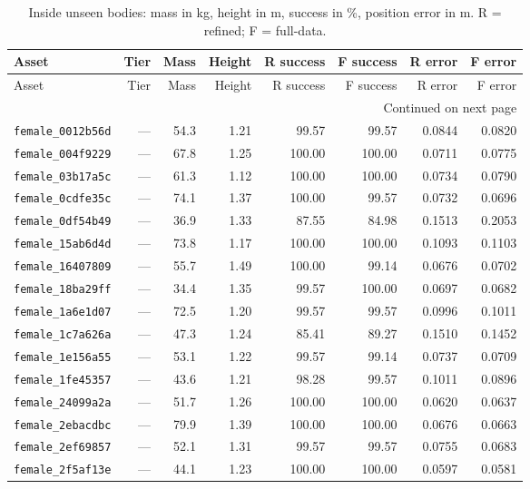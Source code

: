 \documentclass[11pt]{article}
\begin{document}
\begin{longtable}{lrrrrrrr}
\caption{Inside unseen bodies: mass in kg, height in m, success in \%,
position error in m. R = refined; F = full-data.}\label{tab:all_inside}\\
\toprule
Asset & Tier & Mass & Height & R success & F success & R error & F error \\
\midrule\endfirsthead
\toprule
Asset & Tier & Mass & Height & R success & F success & R error & F error \\
\midrule\endhead
\midrule\multicolumn{8}{r}{Continued on next page}\\\endfoot
\bottomrule\endlastfoot

\texttt{female\_0012b56d} & --- & 54.3 & 1.21 & 99.57 & 99.57 & 0.0844 & 0.0820 \\
\texttt{female\_004f9229} & --- & 67.8 & 1.25 & 100.00 & 100.00 & 0.0711 & 0.0775 \\
\texttt{female\_03b17a5c} & --- & 61.3 & 1.12 & 100.00 & 100.00 & 0.0734 & 0.0790 \\
\texttt{female\_0cdfe35c} & --- & 74.1 & 1.37 & 100.00 & 99.57 & 0.0732 & 0.0696 \\
\texttt{female\_0df54b49} & --- & 36.9 & 1.33 & 87.55 & 84.98 & 0.1513 & 0.2053 \\
\texttt{female\_15ab6d4d} & --- & 73.8 & 1.17 & 100.00 & 100.00 & 0.1093 & 0.1103 \\
\texttt{female\_16407809} & --- & 55.7 & 1.49 & 100.00 & 99.14 & 0.0676 & 0.0702 \\
\texttt{female\_18ba29ff} & --- & 34.4 & 1.35 & 99.57 & 100.00 & 0.0697 & 0.0682 \\
\texttt{female\_1a6e1d07} & --- & 72.5 & 1.20 & 99.57 & 99.57 & 0.0996 & 0.1011 \\
\texttt{female\_1c7a626a} & --- & 47.3 & 1.24 & 85.41 & 89.27 & 0.1510 & 0.1452 \\
\texttt{female\_1e156a55} & --- & 53.1 & 1.22 & 99.57 & 99.14 & 0.0737 & 0.0709 \\
\texttt{female\_1fe45357} & --- & 43.6 & 1.21 & 98.28 & 99.57 & 0.1011 & 0.0896 \\
\texttt{female\_24099a2a} & --- & 51.7 & 1.26 & 100.00 & 100.00 & 0.0620 & 0.0637 \\
\texttt{female\_2ebacdbc} & --- & 79.9 & 1.39 & 100.00 & 100.00 & 0.0676 & 0.0663 \\
\texttt{female\_2ef69857} & --- & 52.1 & 1.31 & 99.57 & 99.57 & 0.0755 & 0.0683 \\
\texttt{female\_2f5af13e} & --- & 44.1 & 1.23 & 100.00 & 100.00 & 0.0597 & 0.0581 \\

\end{longtable}
\end{document}
